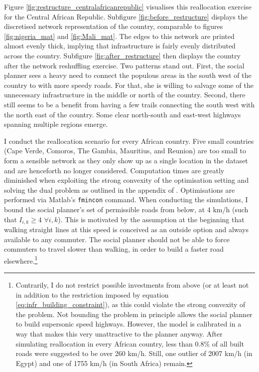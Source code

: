 \documentclass[11pt, oneside]{article}   	%
\begin{document}
Figure \eqref{fig:restructure_centralafricanrepublic} visualises this reallocation exercise for the Central African Republic. Subfigure \eqref{fig:before_restructure} displays the discretised network representation of the country, comparable to figures \eqref{fig:nigeria_mat} and \eqref{fig:Mali_mat}. The edges to this network are printed almost evenly thick, implying that infrastructure is fairly evenly distributed across the country. Subfigure \eqref{fig:after_restructure} then displays the country after the network reshuffling exercise. Two patterns stand out. First, the social planner sees a heavy need to connect the populous areas in the south west of the country to with more speedy roads. For that, she is willing to salvage some of the unnecessary infrastructure in the middle or north of the country. Second, there still seems to be a benefit from having a few trails connecting the south west with the north east of the country. Some clear north-south and east-west highways spanning multiple regions emerge.

I conduct the reallocation scenario for every African country. Five small countries (Cape Verde, Comoros, The Gambia, Mauritius, and Reunion) are too small to form a sensible network as they only show up as a single location in the dataset and are henceforth no longer considered. Computation times are greatly diminished when exploiting the strong convexity of the optimisation setting and solving the dual problem as outlined in the appendix of \cite{fajgelbaum_optimal_2017}. Optimisations are performed via Matlab's \texttt{fmincon} command. When conducting the simulations, I bound the social planner's set of permissible roads from below, at 4 km/h (such that $I_{i,k} \geq 4$ $ \forall i,k$). This is motivated by the assumption at the beginning that walking straight lines at this speed is conceived as an outside option and always available to any commuter. The social planner should not be able to force commuters to travel slower than walking, in order to build a faster road elsewhere.\footnote{Contrarily, I do not restrict possible investments from above (or at least not in addition to the restriction imposed by equation \eqref{eq:infr_building_constraint}), as this could violate the strong convexity of the problem. Not bounding the problem in principle allows the social planner to build supersonic speed highways. However, the model is calibrated in a way that makes this very unattractive to the planner anyway. After simulating reallocation in every African country, less than 0.8\% of all built roads were suggested to be over 260 km/h. Still, one outlier of 2007 km/h (in Egypt) and one of 1755 km/h (in South Africa) remain.}
\end{document}
